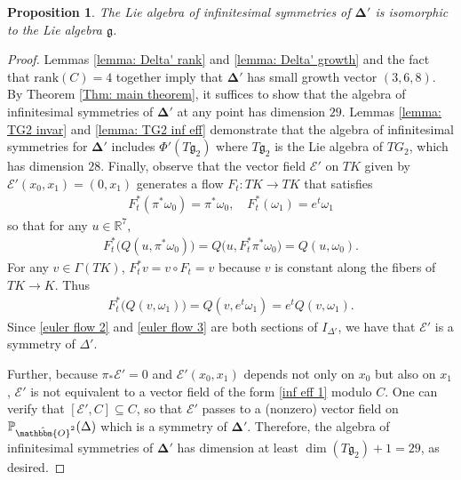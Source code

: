 \documentclass[11pt,letterpaper]{amsart}
\newtheorem{prop}[theorem]{Proposition}
\numberwithin{equation}{section}
\newcommand{\oct}{\hat{\mathbbm{O}}}
\begin{document}
    \begin{prop}
        The Lie algebra of infinitesimal symmetries of $\boldsymbol{\Delta}'$ is isomorphic to the Lie algebra $\mathfrak{g}$.
    \end{prop}
    \begin{proof}
        Lemmas \ref{lemma: Delta' rank} and \ref{lemma: Delta' growth} and the fact that $\mathrm{rank}(C)=4$ together imply that $\boldsymbol{\Delta}'$ has small growth vector $(3,6,8)$. By Theorem \ref{Thm: main theorem}, it suffices to show that the algebra of infinitesimal symmetries of $\boldsymbol{\Delta}'$ at any point has dimension $29$. Lemmas \ref{lemma: TG2 invar} and \ref{lemma: TG2 inf eff} demonstrate that the algebra of infinitesimal symmetries for $\boldsymbol{\Delta}'$ includes $\Phi'(T{\mathfrak{g}}_2)$ where $T{\mathfrak{g}}_2$ is the Lie algebra of $TG_2$, which has dimension $28$. Finally, observe that the vector field $\mathcal E'$ on $TK$ given by $\mathcal E'(x_0,x_1) = (0,x_1)$ generates a flow $F_t:TK\to TK$ that satisfies 
        \begin{gather}
            \label{euler flow 1}
            F_t^*(\pi^*\omega_0) = \pi^*\omega_0,\quad F_t^*(\omega_1) = e^t\omega_1
        \end{gather}
        so that for any $u\in \mathbb{R}^7$,
        \begin{gather}
            \label{euler flow 2}
            F_t^*\big(Q(u,\pi^*\omega_0)\big) = Q\big(u,F_t^*\pi^*\omega_0\big) = Q(u,\omega_0).
        \end{gather}
        For any $v\in \Gamma(TK)$, $F_t^*v = v\circ F_t = v$ because $v$ is constant along the fibers of $TK\to K$. Thus
        \begin{gather}
            \label{euler flow 3}
            F_t^*\big(Q(v,\omega_1)\big) = Q(v,e^t\omega_1) = e^t Q(v,\omega_1).
        \end{gather}
        Since \eqref{euler flow 2} and \eqref{euler flow 3} are both sections of $I_{\Delta'}$, we have that $\mathcal E'$ is a symmetry of $\Delta'$. 
        
        Further, because $\pi_*\mathcal E'=0$ and $\mathcal E'(x_0,x_1)$ depends not only on $x_0$ but also on $x_1$, $\mathcal E'$ is not equivalent to a vector field of the form \eqref{inf eff 1} modulo $C$. One can verify that $[\mathcal E',C]\subseteq C$, so that $\mathcal E'$ passes to a (nonzero) vector field on $\mathbb{P}_{\oct^2}(\Delta)$ which is a symmetry of $\boldsymbol{\Delta}'$. Therefore, the algebra of infinitesimal symmetries of $\boldsymbol{\Delta}'$ has dimension at least $\dim(T{\mathfrak{g}}_2) + 1 = 29$, as desired.
    \end{proof}
\end{document}
